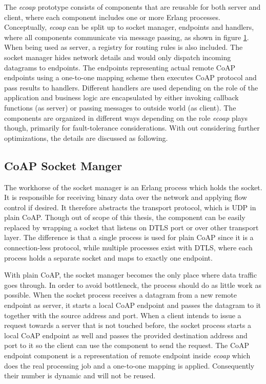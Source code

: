 The \textit{ecoap} prototype consists of components that are reusable for both server and client, where each component includes one or more Erlang processes. Conceptually, \textit{ecoap} can be split up to socket manager, endpoints and handlers, where all components communicate via message passing, as shown in figure \ref{fig:ecoap_arch_logic}. When being used as server, a registry for routing rules is also included. The socket manager hides network details and would only dispatch incoming datagrams to endpoints. The endpoints representing actual remote CoAP endpoints using a one-to-one mapping scheme then executes CoAP protocol and pass results to handlers. Different handlers are used depending on the role of the application and business logic are encapsulated by either invoking callback functions (as server) or passing messages to outside world (as client). The components are organized in different ways depending on the role \textit{ecoap} plays though, primarily for fault-tolerance considerations. With out considering further optimizations, the details are discussed as following.

\begin{figure}
\label{fig:ecoap_arch_logic}
\end{figure}

\subsection{CoAP Socket Manger}\label{socket_manager}

The workhorse of the socket manager is an Erlang process which holds the socket. It is responsible for receiving binary data over the network and applying flow control if desired. It therefore abstracts the transport protocol, which is UDP in plain CoAP. Though out of scope of this thesis, the component can be easily replaced by wrapping a socket that listens on DTLS port or over other transport layer. The difference is that a single process is used for plain CoAP since it is a connection-less protocol, while multiple processes exist with DTLS, where each process holds a separate socket and maps to exactly one endpoint. 

With plain CoAP, the socket manager becomes the only place where data traffic goes through. In order to avoid bottleneck, the process should do as little work as possible. When the socket process receives a datagram from a new remote endpoint as server, it starts a local CoAP endpoint and passes the datagram to it together with the source address and port. When a client intends to issue a request towards a server that is not touched before, the socket process starts a local CoAP endpoint as well and passes the provided destination address and port to it so the client can use the component to send the request. The CoAP endpoint component is a representation of remote endpoint inside \textit{ecoap} which does the real processing job and a one-to-one mapping is applied. Consequently their number is dynamic and will not be reused. 

